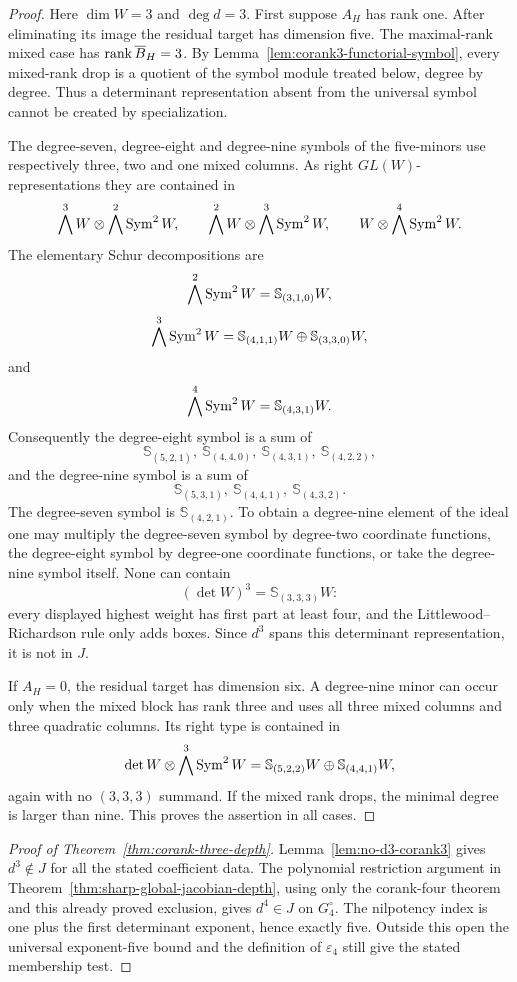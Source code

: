 \begin{proof}
Here \(\dim W=3\) and \(\deg d=3\).  First suppose
\(A_H\) has rank one.  After eliminating its image the residual target
has dimension five.  The maximal-rank mixed case has
\(\operatorname{rank}\overline B_H=3\).  By
Lemma~\ref{lem:corank3-functorial-symbol}, every mixed-rank drop is a
quotient of the symbol module treated below, degree by degree.  Thus a
determinant representation absent from the universal symbol cannot be
created by specialization.

The degree-seven, degree-eight and degree-nine symbols of the
five-minors use respectively three, two and one mixed columns.  As
right \(GL(W)\)-representations they are contained in
\[
 \bigwedge^3W\otimes\bigwedge^2\operatorname{Sym}^2W,\qquad
 \bigwedge^2W\otimes\bigwedge^3\operatorname{Sym}^2W,\qquad
 W\otimes\bigwedge^4\operatorname{Sym}^2W.
\]
The elementary Schur decompositions are
\[
 \bigwedge^2\operatorname{Sym}^2W=\mathbb S_{(3,1,0)}W,
\]
\[
 \bigwedge^3\operatorname{Sym}^2W=
 \mathbb S_{(4,1,1)}W\oplus
 \mathbb S_{(3,3,0)}W,
\]
and
\[
 \bigwedge^4\operatorname{Sym}^2W=\mathbb S_{(4,3,1)}W.
\]
Consequently the degree-eight symbol is a sum of
\[
 \mathbb S_{(5,2,1)},\
 \mathbb S_{(4,4,0)},\
 \mathbb S_{(4,3,1)},\
 \mathbb S_{(4,2,2)},
\]
and the degree-nine symbol is a sum of
\[
 \mathbb S_{(5,3,1)},\
 \mathbb S_{(4,4,1)},\
 \mathbb S_{(4,3,2)}.
\]
The degree-seven symbol is
\(\mathbb S_{(4,2,1)}\).
To obtain a degree-nine element of the ideal one may multiply the
degree-seven symbol by degree-two coordinate functions, the
degree-eight symbol by degree-one coordinate functions, or take the
degree-nine symbol itself.  None can contain
\[
 (\det W)^3=\mathbb S_{(3,3,3)}W:
\]
every displayed highest weight has first part at least four, and the
Littlewood--Richardson rule only adds boxes.  Since \(d^3\) spans
this determinant representation, it is not in \(J\).

If \(A_H=0\), the residual target has dimension six.  A degree-nine
minor can occur only when the mixed block has rank three and uses all
three mixed columns and three quadratic columns.  Its right type is
contained in
\[
 \det W\otimes\bigwedge^3\operatorname{Sym}^2W
 =
 \mathbb S_{(5,2,2)}W
 \oplus
 \mathbb S_{(4,4,1)}W,
\]
again with no \((3,3,3)\) summand.  If the mixed rank drops, the
minimal degree is larger than nine.  This proves the assertion in all
cases.
\end{proof}

\begin{proof}[Proof of Theorem~\ref{thm:corank-three-depth}]
Lemma~\ref{lem:no-d3-corank3} gives \(d^3\notin J\) for all the
stated coefficient data.  The polynomial restriction argument in
Theorem~\ref{thm:sharp-global-jacobian-depth}, using only the
corank-four theorem and this already proved exclusion, gives
\(d^4\in J\) on \(G_4^\circ\).  The nilpotency index is one plus
the first determinant exponent, hence exactly five.  Outside this
open the universal exponent-five bound and the definition of
\(\varepsilon_4\) still give the stated membership test.
\end{proof}

